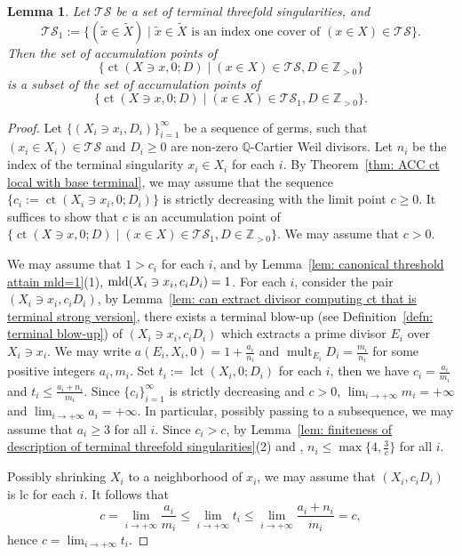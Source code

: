 \documentclass[11pt]{amsart}
\numberwithin{equation}{section}
\newcommand{\Qq}{\mathbb{Q}}
\newcommand{\Zz}{\mathbb{Z}}
\newcommand{\mld}{{\rm{mld}}}
\newcommand{\lct}{\operatorname{lct}}
\newcommand{\ct}{\operatorname{ct}}
\newcommand{\mult}{\operatorname{mult}}
\newtheorem{lem}[thm]{Lemma}
\theoremstyle{definition}
\theoremstyle{definition}
\begin{document}
\begin{lem}\label{lem: The accumulation point of ct reduce to 1-index cover}
Let $\mathcal{TS}$ be a set of terminal threefold singularities, and $$\mathcal{TS}_{1}:=\{(\tilde{x}\in \tilde{X})\mid \tilde{x}\in \tilde{X} \text{ is an index one cover of }(x\in X)\in \mathcal{TS}\}.$$ Then the set of accumulation points of $$\{\ct(X\ni x,0;D)\mid (x\in X)\in \mathcal{TS}, D\in \Zz_{> 0}\}$$ is a subset of the set of accumulation points of $$\{\ct(X\ni x,0;D)\mid (x\in X)\in \mathcal{TS}_1, D\in \Zz_{> 0}\}.$$
\end{lem}

\begin{proof}
Let $\{(X_i\ni x_i, D_i)\}_{i=1}^{\infty}$ be a sequence of germs, such that $(x_i\in X_i)\in \mathcal{TS}$ and $D_i\geq 0$ are non-zero $\Qq$-Cartier Weil divisors. Let $n_i$ be the index of the terminal singularity $x_i\in X_i$ for each $i$. By Theorem~\ref{thm: ACC ct local with base terminal}, we may assume that the sequence $\{c_i:=\ct(X_i\ni x_i,0;D_i)\}$ is strictly decreasing with the limit point $c\geq 0$. It suffices to show that $c$ is an accumulation point of $\{\ct(X\ni x,0;D)\mid (x\in X)\in \mathcal{TS}_1, D\in \Zz_{> 0}\}$. We may assume that $c>0$.

We may assume that $1>c_i$ for each $i$, and by Lemma~\ref{lem: canonical threshold attain mld=1}(1), $\mld(X_i\ni x_i,c_iD_i)=1$. For each $i$, consider the pair $(X_i\ni x_i, c_iD_i)$, by Lemma~\ref{lem: can extract divisor computing ct that is terminal strong version}, there exists a terminal blow-up (see Definition~\ref{defn: terminal blow-up}) of $(X_i\ni x_i,c_iD_i)$ which extracts a prime divisor $E_i$ over $X_i\ni x_i$. We may write $a(E_i,X_i,0)=1+\frac{a_i}{n_i}$ and $\mult_{E_i}D_i=\frac{m_i}{n_i}$ for some positive integers $a_i,m_i$. Set $t_i:=\lct(X_i,0; D_i)$ for each $i$, then we have $c_i=\frac{a_i}{m_i}$ and $t_i\le \frac{a_i+n_i}{m_i}$. Since $\{c_i\}_{i=1}^{\infty}$ is strictly decreasing and $c>0$, $\lim_{i\to +\infty} m_i=+\infty$ and $\lim_{i\to +\infty}a_i=+\infty$. In particular, possibly passing to a subsequence, we may assume that $a_i\geq 3$ for all $i$. Since $c_i>c$, by Lemma~\ref{lem: finiteness of description of terminal threefold singularities}(2) and \cite[(6.1) Theorem]{Rei87}, $n_i\leq \max\{4,\frac{3}{c}\}$ for all $i$.

Possibly shrinking $X_i$ to a neighborhood of $x_i$, we may assume that $(X_i,c_iD_i)$ is lc for each $i$. It follows that  $$c=\lim_{i\to +\infty} \frac{a_i}{m_i}\leq \lim_{i\to +\infty} t_i\leq \lim_{i\to +\infty} \frac{a_i+n_i}{m_i}=c,$$ hence $c=\lim_{i\to +\infty} t_i$. 


\end{proof}
\end{document}
